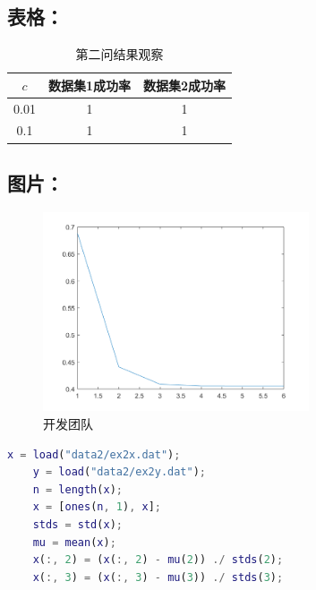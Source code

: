 \documentclass{sdureport}
\begin{document}
\begin{sduDocument}
	\subsection{表格：}
	\begin{table}[H]
		\caption{第二问结果观察}
		\centering
		\linespread{1.5}
		\begin{tabular}{ccc}
			\toprule
			$c$  & 数据集1成功率 & 数据集2成功率 \\
			\midrule
			0.01 & 1             & 1             \\
			0.1  & 1             & 1             \\
			\bottomrule
		\end{tabular}
	\end{table}

	\subsection{图片：}
	\begin{figure}[H]
		\centering
		\includegraphics[width=0.7\textwidth]{figures/L2.png}
		\caption{开发团队}
	\end{figure}


\end{sduDocument}

\sduAppendix %
\begin{lstlisting}[language=matlab]
	x = load("data2/ex2x.dat");
	y = load("data2/ex2y.dat");
	n = length(x);
	x = [ones(n, 1), x];
	stds = std(x);
	mu = mean(x);
	x(:, 2) = (x(:, 2) - mu(2)) ./ stds(2);
	x(:, 3) = (x(:, 3) - mu(3)) ./ stds(3);
\end{lstlisting}
\end{document}
